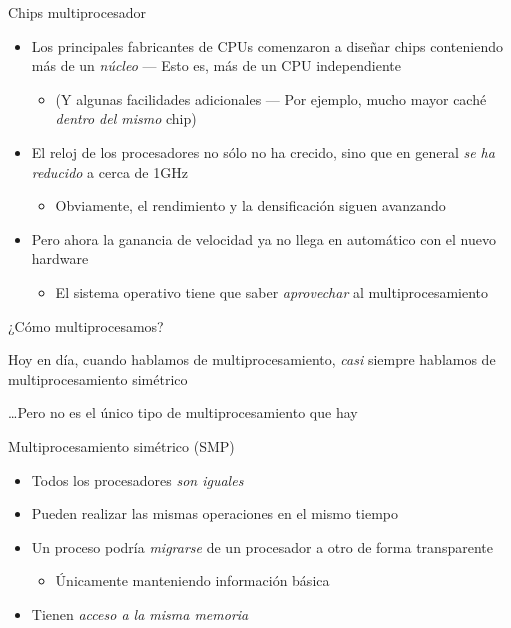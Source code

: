 \documentclass[presentation]{beamer}
\newcommand{\rarrow}{$\rightarrow$\hskip 0.5em}
\begin{document}
\begin{frame}[label={sec:orgc5d7096}]{Chips multiprocesador}
\begin{itemize}
\item Los principales fabricantes de CPUs comenzaron a diseñar chips
conteniendo más de un \emph{núcleo} — Esto es, más de un CPU independiente
\begin{itemize}
\item (Y algunas facilidades adicionales — Por ejemplo, mucho mayor
caché \emph{dentro del mismo} chip)
\end{itemize}
\item El reloj de los procesadores no sólo no ha crecido, sino que en
general \emph{se ha reducido} a cerca de 1GHz
\begin{itemize}
\item Obviamente, el rendimiento y la densificación siguen avanzando
\end{itemize}
\item Pero ahora la ganancia de velocidad ya no llega en automático con el
nuevo hardware
\begin{itemize}
\item El sistema operativo tiene que saber \emph{aprovechar} al
multiprocesamiento
\end{itemize}
\end{itemize}
\end{frame}

\begin{frame}[label={sec:org87505b3}]{¿Cómo multiprocesamos?}
\begin{center}
Hoy en día, cuando hablamos de multiprocesamiento, \emph{casi} siempre
hablamos de multiprocesamiento simétrico
\vfill

\ldots{}Pero no es el único tipo de multiprocesamiento que hay
\end{center}
\end{frame}

\begin{frame}[label={sec:org0412d72}]{Multiprocesamiento simétrico (SMP)}
\begin{itemize}
\item Todos los procesadores \emph{son iguales}
\item Pueden realizar las mismas operaciones en el mismo tiempo
\item Un proceso podría \emph{migrarse} de un procesador a otro de forma
transparente
\begin{itemize}
\item Únicamente manteniendo información básica
\end{itemize}
\item Tienen \emph{acceso a la misma memoria}
\end{itemize}
\end{frame}
\end{document}
